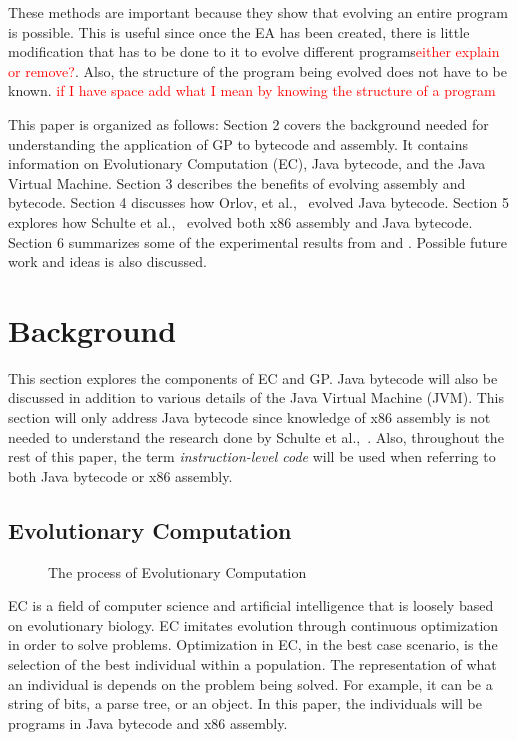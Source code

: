 \documentclass{sig-alternate}
\newcommand{\mycomment}[1]{\textcolor{red}{#1}}
\begin{document}
These methods are important because they show that evolving an entire program is possible. This is useful since once the EA has been created, there is little modification that has to be done to it to evolve different programs\mycomment{either explain or remove?}. Also, the structure of the program being evolved does not have to be known. \mycomment{if I have space add what I mean by knowing the structure of a program}\par
	
This paper is organized as follows: Section 2 covers the background needed for understanding the application of GP to bytecode and assembly. It contains information on Evolutionary Computation (EC), Java bytecode, and the Java Virtual Machine. Section 3 describes the benefits of evolving assembly and bytecode. Section 4 discusses how Orlov, et al.,~\cite{FINCH:2011} evolved Java bytecode. Section 5 explores how Schulte et al.,~\cite{Assembly:2010} evolved both x86 assembly and Java bytecode. Section 6 summarizes some of the experimental results from \cite{FINCH:2011} and \cite{Assembly:2010}.  Possible future work and ideas is also discussed.  
	
	

\section{Background}


This section explores the components of EC and GP. Java bytecode will also be discussed in addition to various details of the Java Virtual Machine (JVM). This section will only address Java bytecode since knowledge of x86 assembly is not needed to understand the research done by Schulte et al.,~\cite{Assembly:2010}. Also, throughout the rest of this paper, the term \textit{instruction-level code} will be used when referring to both Java bytecode or x86 assembly.
\subsection{Evolutionary Computation}
\begin{figure}
\centering
{}

\caption{The process of Evolutionary Computation}
\label{ECdiagram}
\end{figure}


EC is a field of computer science and artificial intelligence that is loosely based on evolutionary biology. EC imitates evolution through continuous optimization in order to solve problems. Optimization in EC, in the best case scenario, is the selection of the best individual within a population. The representation of what an individual is depends on the problem being solved. For example, it can be a string of bits, a parse tree, or an object. In this paper, the individuals will be programs in Java bytecode and x86 assembly.\par 
\end{document}
